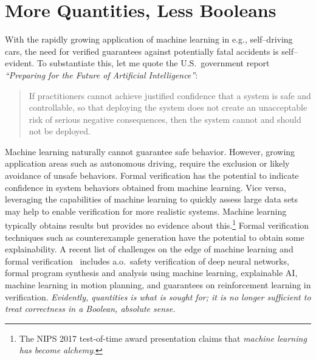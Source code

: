 \documentclass[sigplan,10pt]{acmart}\settopmatter{printfolios=true,printccs=false,printacmref=false}
\begin{document}
\section{More Quantities, Less Booleans} 

With the rapidly growing application of machine learning in e.g., self--driving cars, the need for verified guarantees against potentially fatal accidents is self--evident. 
To substantiate this, let me quote the U.S.\ government report \emph{``Preparing for the Future of Artificial Intelligence''}:
\begin{quote}
{If practitioners cannot achieve justified confidence that a system is safe and controllable, so that deploying the system does not create an unacceptable risk of serious negative consequences, then the system cannot and should not be deployed.}
\end{quote}
Machine learning naturally cannot guarantee safe behavior. 
However, growing application areas such as autonomous driving, require the exclusion or likely avoidance of unsafe behaviors. 
Formal verification has the potential to indicate confidence in system behaviors obtained from machine learning. 
Vice versa, leveraging the capabilities of machine learning to quickly assess large data sets may help to enable verification for more realistic systems.
Machine learning typically obtains results but provides no evidence about this.\footnote{The NIPS 2017 test-of-time award presentation claims that \emph{machine learning has become alchemy}.}
Formal verification techniques such as counterexample generation have the potential to obtain some explainability.
A recent list of challenges on the edge of machine learning and formal verification~\cite{DBLP:journals/dagstuhl-reports/JansenKKK18} includes  a.o.\ safety verification of deep neural networks, formal program synthesis and analysis using machine learning, explainable AI, machine learning in motion planning, and guarantees on reinforcement learning in verification.
\emph{Evidently, quantities is what is sought for; it is no longer sufficient to treat correctness in a Boolean, absolute sense.}


\end{document}
